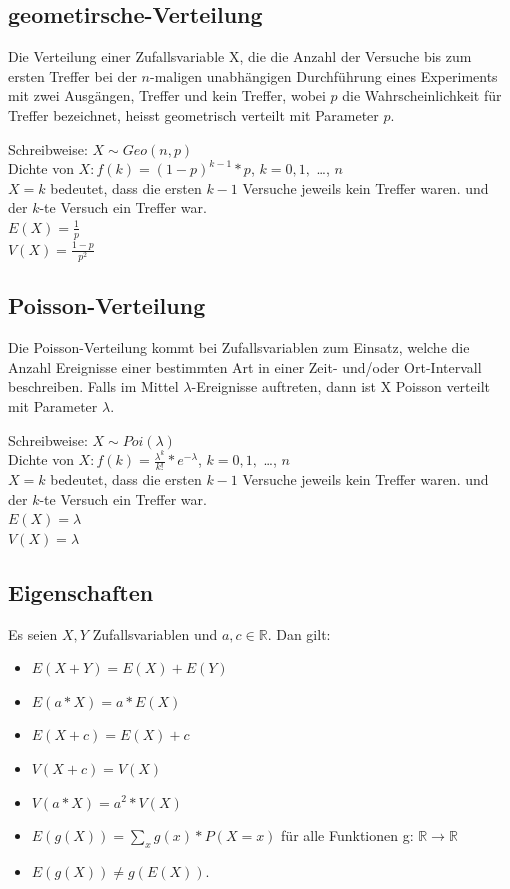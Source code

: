 \documentclass[10pt]{article}
\newtheorem[M]{definition}{Def.}
\newtheorem[M]{satz}{Satz}
\numberwithin{equation}{section}
\newcommand{\RN}{\mathbb{R}} %
\begin{document}
\subsection{geometirsche-Verteilung}
\begin{definition}
Die Verteilung einer Zufallsvariable X, die die Anzahl der Versuche bis zum ersten Treffer bei der $n$-maligen unabhängigen Durchführung eines Experiments mit zwei Ausgängen, Treffer und kein Treffer, wobei $p$ die Wahrscheinlichkeit für Treffer bezeichnet, heisst geometrisch verteilt mit Parameter $p$. \\
\end{definition}
Schreibweise: $X \sim Geo(n,p)$ \\
Dichte von $X : f(k) = (1-p)^{k-1}*p$, $k=0,1,$ \dots, $n$ \\
$X=k$ bedeutet, dass die ersten $k-1$ Versuche jeweils kein Treffer waren. und der $k$-te Versuch ein Treffer war.
\\
$E(X) = \frac{1}{p}$ \\
$V(X) = \frac{1-p}{p^2}$ \\

\subsection{Poisson-Verteilung}
\begin{definition}
Die Poisson-Verteilung kommt bei Zufallsvariablen zum Einsatz, welche die Anzahl Ereignisse einer bestimmten Art in einer Zeit- und/oder Ort-Intervall beschreiben. Falls im Mittel $\lambda$-Ereignisse auftreten, dann ist X Poisson verteilt mit Parameter $\lambda$. \\
\end{definition}
Schreibweise: $X \sim Poi(\lambda)$ \\
Dichte von $X : f(k) =\frac{\lambda^k}{k!}*e^{-\lambda}$, $k=0,1,$ \dots, $n$ \\
$X=k$ bedeutet, dass die ersten $k-1$ Versuche jeweils kein Treffer waren. und der $k$-te Versuch ein Treffer war.
\\
$E(X) = \lambda$ \\
$V(X) = \lambda$ \\

\subsection{Eigenschaften}
\begin{satz}
Es seien $X,Y$ Zufallsvariablen und $a,c \in \RN$.
Dan gilt:
\begin{itemize}
	\item $E(X + Y) = E(X) + E(Y)$ 
	\item $E(a * X) = a * E(X)$
	\item $E(X + c) = E(X) + c$ 
	\item $V(X + c) = V(X)$
	\item $V(a * X) = a^2* V(X)$
	\item $E(g(X)) = \sum_{x} g(x) * P(X=x)$ für alle Funktionen g: $\RN \rightarrow \RN$
	\item $E(g(X)) \neq g(E(X))$.
\end{itemize}
\end{satz}

\end{document}

